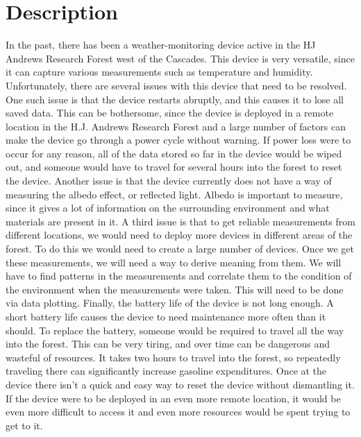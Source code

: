 \documentclass[onecolumn, draftclsnofoot,10pt, compsoc]{IEEEtran}
\begin{document}
\section{Description}
In the past, there has been a weather-monitoring device active in the HJ Andrews Research Forest west of the Cascades. This device is very versatile, since it can capture various measurements such as temperature and humidity. Unfortunately, there are several issues with this device that need to be resolved. 
\newline
One such issue is that the device restarts abruptly, and this causes it to lose all saved data. This can be bothersome, since the device is deployed in a remote location in the H.J. Andrews Research Forest and a large number of factors can make the device go through a power cycle without warning. If power loss were to occur for any reason, all of the data stored so far in the device would be wiped out, and someone would have to travel for several hours into the forest to reset the device.
\newline
Another issue is that the device currently does not have a way of measuring the albedo effect, or reflected light. Albedo is important to measure, since it gives a lot of information on the surrounding environment and what materials are present in it. 
\newline
A third issue is that to get reliable measurements from different locations, we would need to deploy more devices in different areas of the forest. To do this we would need to create a large number of devices.  Once we get these measurements, we will need a way to derive meaning from them. We will have to find patterns in the measurements and correlate them to the condition of the environment when the measurements were taken. This will need to be done via data plotting.
\newline
Finally, the battery life of the device is not long enough. A short battery life causes the device to need maintenance more often than it should.  To replace the battery, someone would be required to travel all the way into the forest. This can be very tiring, and over time can be dangerous and wasteful of resources. It takes two hours to travel into the forest, so repeatedly traveling there can significantly increase gasoline expenditures.  Once at the device there isn’t a quick and easy way to reset the device without dismantling it.  If the device were to be deployed in an even more remote location, it would be even more difficult to access it and even more resources would be spent trying to get to it.
\end{document}
